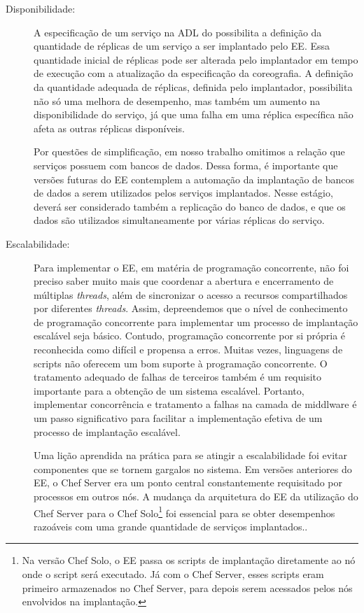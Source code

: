 \begin{description}
\item [Disponibilidade:]

A especificação de um serviço na ADL do \ee possibilita a definição da quantidade de réplicas
de um serviço a ser implantado pelo EE.
Essa quantidade inicial de réplicas pode ser alterada pelo implantador em tempo de execução
com a atualização da especificação da coreografia.
A definição da quantidade adequada de réplicas, definida pelo implantador, possibilita não só uma melhora
de desempenho, mas também um aumento na disponibilidade do serviço, já que uma falha em uma réplica
específica não afeta as outras réplicas disponíveis.

Por questões de simplificação, em nosso trabalho omitimos a relação que serviços possuem com bancos de dados.
Dessa forma, é importante que versões futuras do EE contemplem a automação da implantação de bancos de dados
a serem utilizados pelos serviços implantados. Nesse estágio, deverá ser considerado também a replicação
do banco de dados, e que os dados são utilizados simultaneamente por várias réplicas do serviço.

\item [Escalabilidade:]

Para implementar o EE, em matéria de programação concorrente, 
não foi preciso saber muito mais que coordenar a abertura e encerramento de múltiplas \emph{threads},
além de sincronizar o acesso a recursos compartilhados por diferentes \emph{threads}.
Assim, depreendemos que o nível de conhecimento de programação concorrente para implementar
um processo de implantação escalável seja básico.
Contudo, programação concorrente por si própria é reconhecida como difícil e propensa a erros. 
Muitas vezes, linguagens de scripts não oferecem um bom suporte à programação concorrente.
O tratamento adequado de falhas de terceiros também é um requisito importante
para a obtenção de um sistema escalável.
Portanto, implementar concorrência e tratamento a falhas na camada de middlware
é um passo significativo para facilitar a implementação efetiva de um
processo de implantação escalável.

Uma lição aprendida na prática para se atingir a escalabilidade
foi evitar componentes que se tornem gargalos no sistema.
Em versões anteriores do EE, o Chef Server era um ponto central
constantemente requisitado por processos em outros nós.
A mudança da arquitetura do EE da utilização do Chef Server
para o Chef Solo\footnote{Na versão Chef Solo, o EE passa os scripts de implantação
diretamente ao nó onde o script será executado. Já com o Chef Server, esses scripts eram
primeiro armazenados no Chef Server, para depois serem acessados 
pelos nós envolvidos na implantação.} 
foi essencial para se obter desempenhos razoáveis
com uma grande quantidade de serviços implantados..


\end{description}
